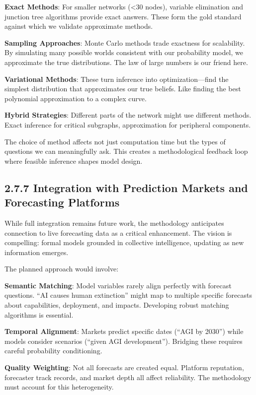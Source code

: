 \documentclass[
  11pt,
  letterpaper,
  openany]{book}
\begin{document}
\textbf{Exact Methods}: For smaller networks (\textless30 nodes),
variable elimination and junction tree algorithms provide exact answers.
These form the gold standard against which we validate approximate
methods.

\textbf{Sampling Approaches}: Monte Carlo methods trade exactness for
scalability. By simulating many possible worlds consistent with our
probability model, we approximate the true distributions. The law of
large numbers is our friend here.

\textbf{Variational Methods}: These turn inference into
optimization---find the simplest distribution that approximates our true
beliefs. Like finding the best polynomial approximation to a complex
curve.

\textbf{Hybrid Strategies}: Different parts of the network might use
different methods. Exact inference for critical subgraphs, approximation
for peripheral components.

The choice of method affects not just computation time but the types of
questions we can meaningfully ask. This creates a methodological
feedback loop where feasible inference shapes model design.

\subsection{2.7.7 Integration with Prediction Markets and Forecasting
Platforms}\label{sec-prediction-markets}

While full integration remains future work, the methodology anticipates
connection to live forecasting data as a critical enhancement. The
vision is compelling: formal models grounded in collective intelligence,
updating as new information emerges.

The planned approach would involve:

\textbf{Semantic Matching}: Model variables rarely align perfectly with
forecast questions. ``AI causes human extinction'' might map to multiple
specific forecasts about capabilities, deployment, and impacts.
Developing robust matching algorithms is essential.

\textbf{Temporal Alignment}: Markets predict specific dates (``AGI by
2030'') while models consider scenarios (``given AGI development'').
Bridging these requires careful probability conditioning.

\textbf{Quality Weighting}: Not all forecasts are created equal.
Platform reputation, forecaster track records, and market depth all
affect reliability. The methodology must account for this heterogeneity.
\end{document}
